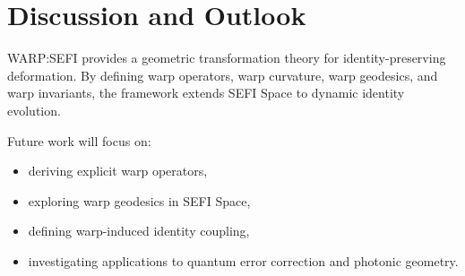 \documentclass[12pt,twoside]{article}
\begin{document}
\section{Discussion and Outlook}

WARP:SEFI provides a geometric transformation theory for identity-preserving deformation.
By defining warp operators, warp curvature, warp geodesics, and warp invariants, the
framework extends SEFI Space to dynamic identity evolution.

Future work will focus on:

\begin{itemize}
    \item deriving explicit warp operators,
    \item exploring warp geodesics in SEFI Space,
    \item defining warp-induced identity coupling,
    \item investigating applications to quantum error correction and photonic geometry.
\end{itemize}

\end{document}
